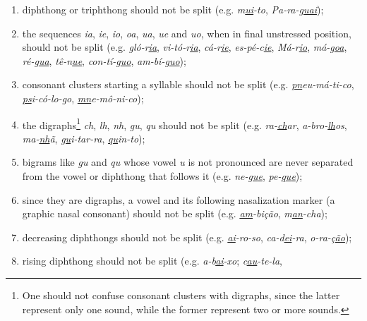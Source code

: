 \documentclass{article}
\begin{document}
\begin{enumerate}
    \item\label{rule-di-triphthong} diphthong or triphthong should not be split
	(e.g. \emph{m\underline{\emph{ui}}-to}, \emph{Pa-ra-g\underline{\emph{uai}}});
    \item\label{rule-unstressed} the sequences \emph{ia}, \emph{ie}, \emph{io}, \emph{oa}, \emph{ua},
	\emph{ue} and \emph{uo}, when in final unstressed position, should not be split 
	(e.g. \emph{gló-r\underline{\emph{ia}}}, \emph{vi-tó-r\underline{\emph{ia}}}, 
	\emph{cá-r\underline{\emph{ie}}}, \emph{es-pé-c\underline{\emph{ie}}}, 
	\emph{Má-r\underline{\emph{io}}}, \emph{má-g\underline{\emph{oa}}}, 
	\emph{ré-g\underline{\emph{ua}}}, \emph{tê-n\underline{\emph{ue}}}, 
	\emph{con-tí-g\underline{\emph{uo}}}, \emph{am-bí-g\underline{\emph{uo}}});
    \item\label{rule-c-clusters} consonant clusters starting a syllable should not be
	split (e.g. \emph{\underline{\emph{pn}}eu-má-ti-co}, \emph{\underline{\emph{ps}}i-có-lo-go}, 
	\emph{\underline{\emph{mn}}e-mô-ni-co});
    \item\label{rules-digraphs-ns} the digraphs\footnote{One should not confuse consonant clusters 
	with digraphs, since the latter represent only one sound, while the former represent two or more sounds.}
	\emph{ch}, \emph{lh}, \emph{nh}, \emph{gu}, \emph{qu} 
	should not be split (e.g. \emph{ra-\underline{\emph{ch}}ar},
	\emph{a-bro-\underline{\emph{lh}}os}, \emph{ma-\underline{\emph{nh}}ã},
	\emph{\underline{\emph{gu}}i-tar-ra}, \emph{\underline{\emph{qu}}in-to});
    \item\label{rule-guqu} bigrams like \emph{gu} and \emph{qu} whose vowel \emph{u} is not 
	pronounced are never separated from the vowel or diphthong that follows it 
	(e.g. \emph{ne-\underline{\emph{gu}e}}, \emph{pe-\underline{\emph{qu}e}});
    \item\label{rule-nasalization} since they are digraphs, a vowel and its following 
	nasalization marker (a graphic nasal consonant) should not be split (e.g. \emph{\underline{\emph{am}}-bição},
	\emph{m\underline{\emph{an}}-cha});
    \item\label{rule-decreasing} decreasing diphthongs should not be split (e.g. 
	\emph{\underline{\emph{ai}}-ro-so}, \emph{ca-d\underline{\emph{ei}}-ra}, 
	\emph{o-ra-ç\underline{\emph{ão}}});
    \item\label{rule-rising} rising diphthong should not be split (e.g.
	\emph{a-b\underline{\emph{ai}}-xo}; \emph{c\underline{\emph{au}}-te-la}, 

\end{enumerate}
\end{document}
